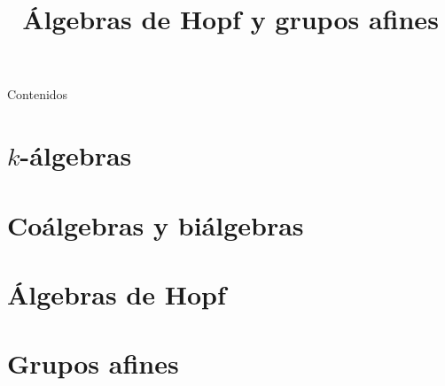 \documentclass{beamer}
\title{\'{A}lgebras de Hopf y grupos afines}
\subtitle{}
\author{}
\institute{
}
\date{}
\begin{document}
\begin{frame}
  \titlepage
\end{frame}

\begin{frame}{Contenidos}
  \tableofcontents
\end{frame}

\section{$k$-\'{a}lgebras}


\section{Co\'{a}lgebras y bi\'{a}lgebras}


\section{\'{A}lgebras de Hopf}


\section{Grupos afines}

\end{document}
